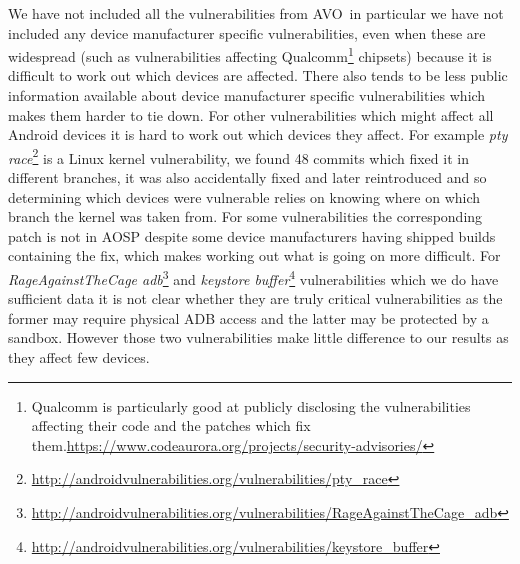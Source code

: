 \documentclass[conference,a4paper,twoside]{IEEEtran}
\newcommand{\avo}{AVO}
\begin{document}
We have not included all the vulnerabilities from \avo\, in particular we have not included any device manufacturer specific vulnerabilities, even when these are widespread (such as vulnerabilities affecting Qualcomm\footnote{Qualcomm is particularly good at publicly disclosing the vulnerabilities affecting their code and the patches which fix them.\url{https://www.codeaurora.org/projects/security-advisories/}} chipsets) because it is difficult to work out which devices are affected.
There also tends to be less public information available about device manufacturer specific vulnerabilities which makes them harder to tie down.
For other vulnerabilities which might affect all Android devices it is hard to work out which devices they affect.
For example \emph{pty race}\footnote{\url{http://androidvulnerabilities.org/vulnerabilities/pty_race}} is a Linux kernel vulnerability, we found 48 commits which fixed it in different branches, it was also accidentally fixed and later reintroduced and so determining which devices were vulnerable relies on knowing where on which branch the kernel was taken from.
For some vulnerabilities the corresponding patch is not in AOSP despite some device manufacturers having shipped builds containing the fix, which makes working out what is going on more difficult.
For \emph{RageAgainstTheCage adb}\footnote{\url{http://androidvulnerabilities.org/vulnerabilities/RageAgainstTheCage_adb}} and \emph{keystore buffer}\footnote{\url{http://androidvulnerabilities.org/vulnerabilities/keystore_buffer}} vulnerabilities which we do have sufficient data it is not clear whether they are truly critical vulnerabilities as the former may require physical ADB access and the latter may be protected by a sandbox.
However those two vulnerabilities make little difference to our results as they affect few devices.
\end{document}
